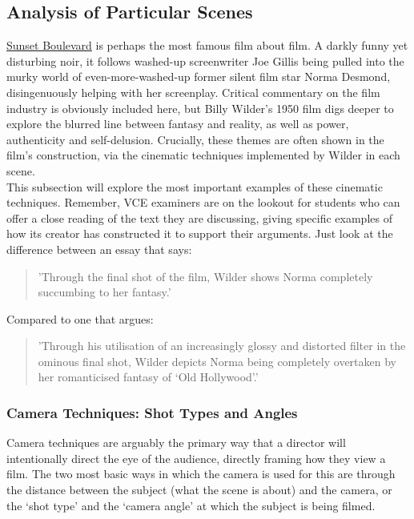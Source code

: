 \documentclass[a4paper]{article}
\begin{document}
\subsection{Analysis of Particular Scenes}
\underline{Sunset Boulevard} is perhaps the most famous film about film. A darkly funny yet disturbing noir, it follows washed-up screenwriter Joe Gillis being pulled into the murky world of even-more-washed-up former silent film star Norma Desmond, disingenuously helping with her screenplay. Critical commentary on the film industry is obviously included here, but Billy Wilder’s 1950 film digs deeper to explore the blurred line between fantasy and reality, as well as power, authenticity and self-delusion. Crucially, these themes are often shown in the film’s construction, via the cinematic techniques implemented by Wilder in each scene.\\

This subsection will explore the most important examples of these cinematic techniques. Remember, VCE examiners are on the lookout for students who can offer a close reading of the text they are discussing, giving specific examples of how its creator has constructed it to support their arguments. Just look at the difference between an essay that says:

\begin{quote}
    'Through the final shot of the film, Wilder shows Norma completely succumbing to her fantasy.’ 
\end{quote}

Compared to one that argues:

\begin{quote}
    'Through his utilisation of an increasingly glossy and distorted filter in the ominous final shot, Wilder depicts Norma being completely overtaken by her romanticised fantasy of ‘Old Hollywood’.'
\end{quote}

\subsubsection{Camera Techniques: Shot Types and Angles}
Camera techniques are arguably the primary way that a director will intentionally direct the eye of the audience, directly framing how they view a film. The two most basic ways in which the camera is used for this are through the distance between the subject (what the scene is about) and the camera, or the ‘shot type’ and the ‘camera angle’ at which the subject is being filmed.\\
\end{document}
